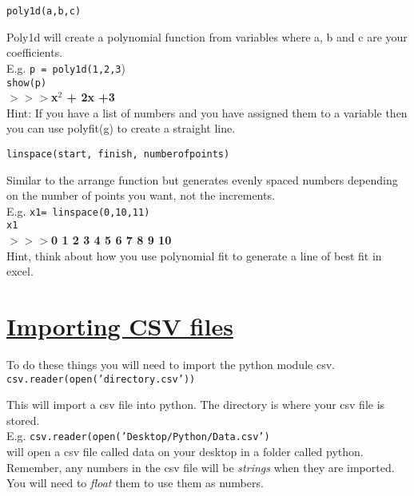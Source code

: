 \noindent \texttt{poly1d(a,b,c)}
\begin{myindentpar}{1.4cm}
\vspace*{-1ex}
Poly1d will create a polynomial function from variables where a, b and c are your coefficients.\\
E.g. \texttt{p = poly1d(1,2,3})\\
\texttt{show(p)}\\
\textbf{$>>>$x$^{2}$ + 2x +3}\\
Hint: If you have a list of numbers and you have assigned them to a variable then you can use polyfit(g) to create a straight line.
\end{myindentpar}

\noindent \texttt{linspace(start, finish, numberofpoints)}

\begin{myindentpar}{1.4cm}
\vspace*{-1ex}
Similar to the arrange function but generates evenly spaced numbers depending on the number of points you want, not the increments.\\
E.g. \texttt{x1= linspace(0,10,11)}\\
\texttt{x1}\\
\textbf{$>>>$0  1  2  3  4  5  6  7  8  9  10}\\
Hint, think about how you use polynomial fit to generate a line of best fit in excel.

\end{myindentpar}

\section*{\underline{Importing CSV files}}
To do these things you will need to import the python module csv.\\[2ex]
\noindent \texttt{csv.reader(open('directory.csv'))}
\begin{myindentpar}{1.4cm}
\vspace*{-1ex}
This will import a csv file into python. The directory is where your csv file is stored.\\
E.g. \texttt{csv.reader(open('Desktop/Python/Data.csv')}\\
will open a csv file called data on your desktop in a folder called python.\\
Remember, any numbers in the csv file will be \textit{strings} when they are imported. You will need to \textit{float} them to use them as numbers.
\end{myindentpar}

